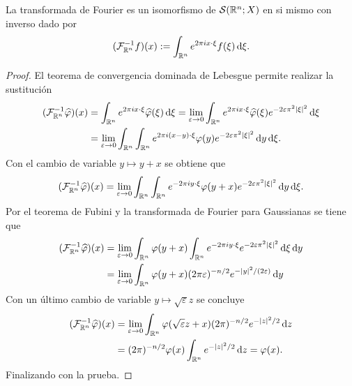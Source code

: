 \begin{theorem}
    La transformada de Fourier es un isomorfismo de $\mathcal{S}(\mathbb{R}^n;X)$ en si 
    mismo con inverso dado por 
    \begin{equation*}
        (\mathcal{F}^{-1}_{\mathbb{R}^n}f)(x) := \int_{\mathbb{R}^n} e^{2\pi i x \cdot \xi} f(\xi)
        \mathop{}\!\mathrm{d} \xi.
    \end{equation*}
\end{theorem}
\begin{proof}
    El teorema de convergencia dominada de Lebesgue permite realizar la 
    sustitución
    \begin{align*}
        (\mathcal{F}^{-1}_{\mathbb{R}^n}\widehat{\varphi})(x) &= 
        \int_{\mathbb{R}^n}e^{2\pi ix \cdot \xi} \widehat{\varphi}(\xi)\mathop{}\!\mathrm{d} \xi
        = \lim_{\varepsilon\rightarrow0} 
        \int_{\mathbb{R}^n}e^{2\pi ix \cdot \xi} \widehat{\varphi}(\xi)
        e^{-2\varepsilon\pi^2|\xi|^2} \mathop{}\!\mathrm{d} \xi \\
        &= \lim_{\varepsilon\rightarrow0} \int_{\mathbb{R}^n}
        \int_{\mathbb{R}^n}e^{2\pi i(x-y) \cdot \xi} \varphi(y)
        e^{-2\varepsilon\pi^2|\xi|^2} \mathop{}\!\mathrm{d} y \mathop{}\!\mathrm{d} \xi.
    \end{align*}
    Con el cambio de variable $y \mapsto y+x$ se obtiene que
    \begin{equation*}
        (\mathcal{F}^{-1}_{\mathbb{R}^n}\widehat{\varphi})(x) = 
        \lim_{\varepsilon\rightarrow0} \int_{\mathbb{R}^n}
        \int_{\mathbb{R}^n}e^{-2\pi iy \cdot \xi} \varphi(y+x)
        e^{-2\varepsilon\pi^2|\xi|^2} \mathop{}\!\mathrm{d} y \mathop{}\!\mathrm{d} \xi.
    \end{equation*}
    Por el teorema de Fubini y la transformada de Fourier para 
    Gaussianas se tiene que
    \begin{align*}
        (\mathcal{F}^{-1}_{\mathbb{R}^n}\widehat{\varphi})(x) &= 
        \lim_{\varepsilon\rightarrow0} \int_{\mathbb{R}^n} \varphi(y+x) 
        \int_{\mathbb{R}^n}e^{-2\pi iy \cdot \xi} 
        e^{-2\varepsilon\pi^2|\xi|^2}  \mathop{}\!\mathrm{d} \xi \mathop{}\!\mathrm{d} y \\
        & = \lim_{\varepsilon\rightarrow0} \int_{\mathbb{R}^n} \varphi(y+x) 
        (2\pi\varepsilon)^{-n/2} e^{-|y|^2/(2\varepsilon)} \mathop{}\!\mathrm{d} y
    \end{align*}
    Con un último cambio de variable $y\mapsto\sqrt{\varepsilon}z$
    se concluye 
    \begin{align*}
        (\mathcal{F}^{-1}_{\mathbb{R}^n}\widehat{\varphi})(x) &= 
        \lim_{\varepsilon\rightarrow0} \int_{\mathbb{R}^n} \varphi(\sqrt{\varepsilon}z+x) 
        (2\pi)^{-n/2} e^{-|z|^2/2} \mathop{}\!\mathrm{d} z \\
        & = (2\pi)^{-n/2} \varphi(x) \int_{\mathbb{R}^n}e^{-|z|^2/2} \mathop{}\!\mathrm{d} z = \varphi(x).
    \end{align*}
    Finalizando con la prueba.
\end{proof}
